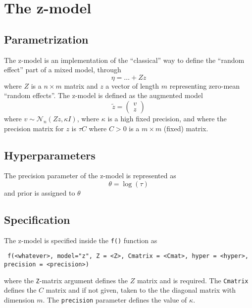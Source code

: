 \documentclass[a4paper,11pt]{article}
\begin{document}
\section*{The z-model}

\subsection*{Parametrization}

The z-model is an implementation of the ``classical'' way to define
the ``random effect'' part of a mixed model, through
\begin{displaymath}
    \eta = \ldots + Z z 
\end{displaymath}
where $Z$ is a $n\times m$ matrix and $z$ a vector of length $m$
representing zero-mean ``random effects''. The z-model is defined as
the augmented model
\begin{displaymath}
    \widetilde{z} =
    \begin{pmatrix}
        v \\
        z 
    \end{pmatrix}
\end{displaymath}
where $v \sim {\mathcal N}_{n}(Zz, \kappa I)$, where $\kappa$ is a high
fixed precision, and where the precision matrix for $z$ is $\tau C$
where $C > 0$ is a $m\times m$ (fixed) matrix.

\subsection*{Hyperparameters}

The precision parameter of the z-model is represented as
\begin{displaymath}
    \theta = \log(\tau)
\end{displaymath}
and prior is assigned to $\theta$

\subsection*{Specification}

The z-model is specified inside the {\tt f()} function as
\begin{verbatim}
 f(<whatever>, model="z", Z = <Z>, Cmatrix = <Cmat>, hyper = <hyper>,
precision = <precision>)
\end{verbatim}
where the \texttt{Z}-matrix argument defines the $Z$ matrix and is
required. The \texttt{Cmatrix} defines the $C$ matrix and if not
given, taken to the the diagonal matrix with dimension $m$. The
\texttt{precision} parameter defines the value of $\kappa$.
\end{document}
